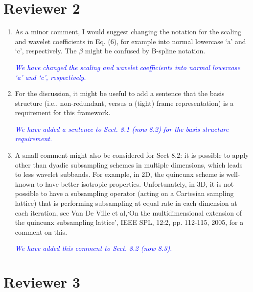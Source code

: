 \documentclass{article}
\newcommand{\parham}[1]{\textcolor{blue}{#1}}
\begin{document}
    \section{Reviewer 2}
    
\begin{enumerate}
    \item As a minor comment, I would suggest changing the notation for the scaling and wavelet coefficients in Eq. (6), for example into normal lowercase `a' and `c', respectively. The $\beta$ might be confused by B-spline notation. 

	\emph{\parham{We have changed the scaling and wavelet coefficients into normal lowercase `a' and `c', respectively.}}

\item For the discussion, it might be useful to add a sentence that the basis structure (i.e., non-redundant, versus a (tight) frame representation) is a requirement for this framework.

\emph{\parham{We have added a sentence to Sect. 8.1 (now 8.2) for the basis structure requirement.}}

\item A small comment might also be considered for Sect 8.2: it is possible to apply other than dyadic subsampling schemes in multiple dimensions, which leads to less wavelet subbands. For example, in 2D, the quincunx scheme is well-known to have better isotropic properties. Unfortunately, in 3D, it is not possible to have a subsampling operator (acting on a Cartesian sampling lattice) that is performing subsampling at equal rate in each dimension at each iteration, see Van De Ville et al,`On the multidimensional extension of the quincunx subsampling lattice', IEEE SPL, 12:2, pp.  112-115, 2005, for a comment on this. 

\emph{\parham{We have added this comment to Sect. 8.2 (now 8.3).}}



 

\end{enumerate}  

    \section{Reviewer 3}  
\end{document}
